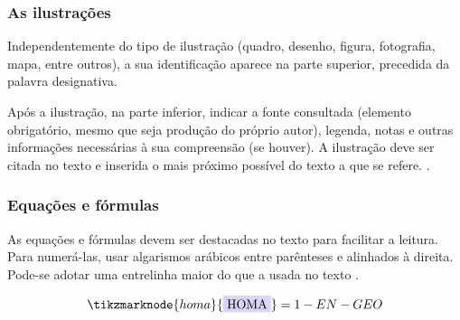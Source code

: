\subsubsection{As ilustrações}

Independentemente do tipo de ilustração (quadro, desenho, figura, fotografia, mapa, entre outros), a sua identificação aparece na parte superior, precedida da palavra designativa. 

\begin{citacao}
	Após a ilustração, na parte inferior, indicar a fonte consultada (elemento obrigatório, mesmo que seja produção do próprio autor), legenda, notas e outras informações necessárias à sua compreensão (se houver). A ilustração deve ser citada no texto e inserida o mais próximo possível do texto a que se refere. \cite[p. 11]{NBR14724:2011}.
\end{citacao}

\subsubsection{Equações e fórmulas}

As equações e fórmulas devem ser destacadas no texto para facilitar a leitura.  Para numerá-las, usar algarismos arábicos entre parênteses e alinhados à direita. Pode-se adotar uma entrelinha maior do que a usada no texto \cite{NBR14724:2011}. \\




\begin{figure}[htb]
    \vspace{2\baselineskip}
\begin{equation}
    \label{correcao}
    \tikzmarknode{homa}{\highlight{blue}{HOMA}} = 1 - EN - GEO
\end{equation}
\end{figure}



